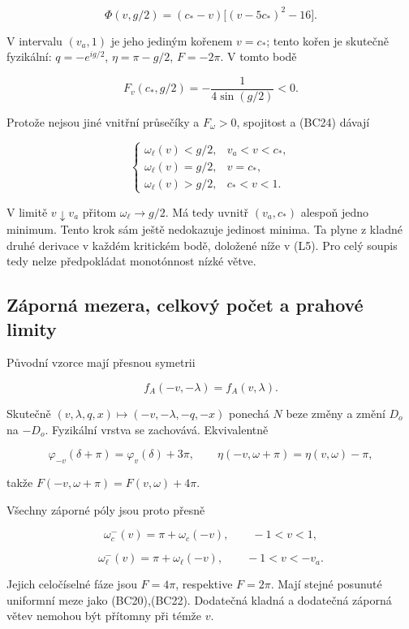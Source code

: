 \documentclass[11pt,a4paper]{article}
\theoremstyle{remark}\newtheorem{remark}[theorem]{Poznámka}
\numberwithin{equation}{section}
\begin{document}
\[
\Phi(v,g/2)
=(c_*-v)\big[(v-5c_*)^2-16\big].
\tag{BC23}
\]

V intervalu \((v_a,1)\) je jeho jediným kořenem \(v=c_*\); tento kořen
je skutečně fyzikální: \(q=-e^{ig/2}\), \(\eta=\pi-g/2\), \(F=-2\pi\). V
tomto bodě

\[
F_v(c_*,g/2)=-\frac1{4\sin(g/2)}<0.
\tag{BC24}
\]

Protože nejsou jiné vnitřní průsečíky a \(F_\omega>0\), spojitost a
(BC24) dávají

\[
\begin{cases}
\omega_\ell(v)<g/2,& v_a<v<c_*,\\
\omega_\ell(v)=g/2,& v=c_*,\\
\omega_\ell(v)>g/2,& c_*<v<1.
\end{cases}
\tag{BC25}
\]

V limitě \(v\downarrow v_a\) přitom \(\omega_\ell\to g/2\). Má tedy
uvnitř \((v_a,c_*)\) alespoň jedno minimum. Tento krok sám ještě
nedokazuje jedinost minima. Ta plyne z kladné druhé derivace v každém
kritickém bodě, doložené níže v (L5). Pro celý soupis tedy nelze
předpokládat monotónnost nízké větve.

\hypertarget{zuxe1pornuxe1-mezera-celkovuxfd-poux10det-a-prahovuxe9-limity}{%
\subsection{Záporná mezera, celkový počet a prahové
limity}\label{zuxe1pornuxe1-mezera-celkovuxfd-poux10det-a-prahovuxe9-limity}}

Původní vzorce mají přesnou symetrii

\[
f_A(-v,-\lambda)=f_A(v,\lambda).
\tag{BC26}
\]

Skutečně \((v,\lambda,q,x)\mapsto(-v,-\lambda,-q,-x)\) ponechá \(N\)
beze změny a změní \(D_o\) na \(-D_o\). Fyzikální vrstva se zachovává.
Ekvivalentně

\[
\varphi_{-v}(\delta+\pi)=\varphi_v(\delta)+3\pi,
\qquad
\eta(-v,\omega+\pi)=\eta(v,\omega)-\pi,
\]

takže \(F(-v,\omega+\pi)=F(v,\omega)+4\pi\).

Všechny záporné póly jsou proto přesně

\[
\omega_c^-(v)=\pi+\omega_c(-v),\qquad -1<v<1,
\tag{BC27}
\]

\[
\omega_\ell^-(v)=\pi+\omega_\ell(-v),\qquad -1<v<-v_a.
\tag{BC28}
\]

Jejich celočíselné fáze jsou \(F=4\pi\), respektive \(F=2\pi\). Mají
stejné posunuté uniformní meze jako (BC20),(BC22). Dodatečná kladná a
dodatečná záporná větev nemohou být přítomny při témže \(v\).
\end{document}
